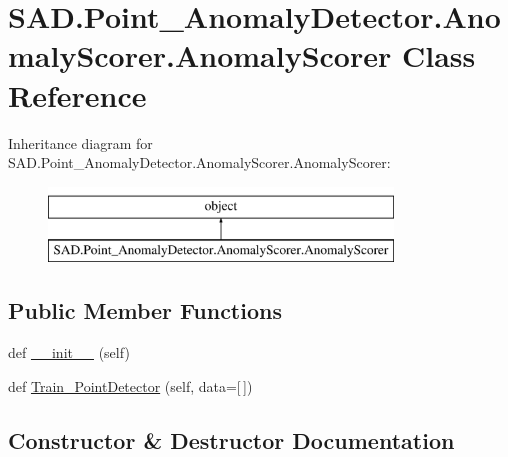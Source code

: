 \hypertarget{classSAD_1_1Point__AnomalyDetector_1_1AnomalyScorer_1_1AnomalyScorer}{}\section{S\+A\+D.\+Point\+\_\+\+Anomaly\+Detector.\+Anomaly\+Scorer.\+Anomaly\+Scorer Class Reference}
\label{classSAD_1_1Point__AnomalyDetector_1_1AnomalyScorer_1_1AnomalyScorer}
Inheritance diagram for S\+A\+D.\+Point\+\_\+\+Anomaly\+Detector.\+Anomaly\+Scorer.\+Anomaly\+Scorer\+:\begin{figure}[H]
\begin{center}
\leavevmode
\includegraphics[height=2.000000cm]{classSAD_1_1Point__AnomalyDetector_1_1AnomalyScorer_1_1AnomalyScorer}
\end{center}
\end{figure}
\subsection*{Public Member Functions}
\begin{DoxyCompactItemize}
\item 
def \hyperlink{classSAD_1_1Point__AnomalyDetector_1_1AnomalyScorer_1_1AnomalyScorer_a4109f8186ad1aa9c28c2f12fcc36c714}{\+\_\+\+\_\+init\+\_\+\+\_\+} (self)
\item 
def \hyperlink{classSAD_1_1Point__AnomalyDetector_1_1AnomalyScorer_1_1AnomalyScorer_a22e40f7116e20bd61b81510970266151}{Train\+\_\+\+Point\+Detector} (self, data=\mbox{[}$\,$\mbox{]})
\end{DoxyCompactItemize}


\subsection{Constructor \& Destructor Documentation}
